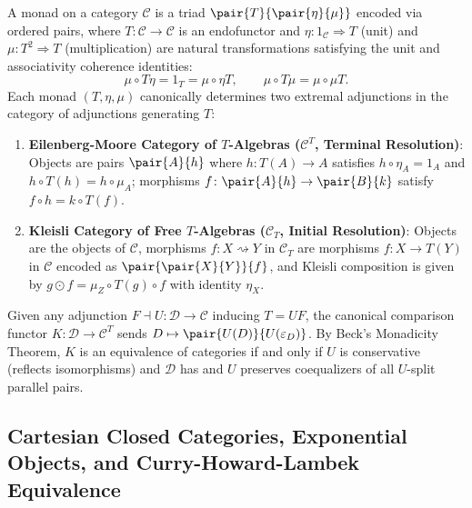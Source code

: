 A monad on a category $\mathcal{C}$ is a triad $\pair{T}{\pair{\eta}{\mu}}$ encoded via ordered pairs, where $T\colon \mathcal{C} \to \mathcal{C}$ is an endofunctor and $\eta\colon 1_{\mathcal{C}} \Rightarrow T$ (unit) and $\mu\colon T^2 \Rightarrow T$ (multiplication) are natural transformations satisfying the unit and associativity coherence identities:
\[
\mu \circ T\eta = 1_T = \mu \circ \eta T, \qquad \mu \circ T\mu = \mu \circ \mu T.
\]
Each monad $(T, \eta, \mu)$ canonically determines two extremal adjunctions in the category of adjunctions generating $T$:
\begin{enumerate}
  \item \textbf{Eilenberg-Moore Category of $T$-Algebras ($\mathcal{C}^T$, Terminal Resolution)}: Objects are pairs $\pair{A}{h}$ where $h\colon T(A) \to A$ satisfies $h \circ \eta_A = 1_A$ and $h \circ T(h) = h \circ \mu_A$; morphisms $f\colon \pair{A}{h} \to \pair{B}{k}$ satisfy $f \circ h = k \circ T(f)$.
  \item \textbf{Kleisli Category of Free $T$-Algebras ($\mathcal{C}_T$, Initial Resolution)}: Objects are the objects of $\mathcal{C}$, morphisms $f\colon X \rightsquigarrow Y$ in $\mathcal{C}_T$ are morphisms $f\colon X \to T(Y)$ in $\mathcal{C}$ encoded as $\pair{\pair{X}{Y}}{f}$, and Kleisli composition is given by $g \odot f = \mu_Z \circ T(g) \circ f$ with identity $\eta_X$.
\end{enumerate}
Given any adjunction $F \dashv U\colon \mathcal{D} \to \mathcal{C}$ inducing $T = UF$, the canonical comparison functor $K\colon \mathcal{D} \to \mathcal{C}^T$ sends $D \mapsto \pair{U(D)}{U(\varepsilon_D)}$. By Beck's Monadicity Theorem, $K$ is an equivalence of categories if and only if $U$ is conservative (reflects isomorphisms) and $\mathcal{D}$ has and $U$ preserves coequalizers of all $U$-split parallel pairs.

\subsection{Cartesian Closed Categories, Exponential Objects, and Curry-Howard-Lambek Equivalence}
\label{subsec:ccc_exponentials_curry_howard_lambek}

